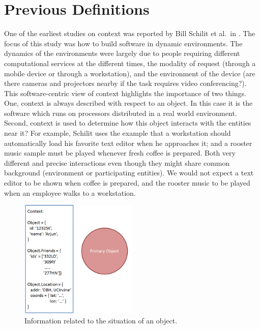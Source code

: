 \section{Previous Definitions}

One of the earliest studies on context was reported by Bill Schilit et al.\ in \cite{schilit1994context}. The focus of this study was how to build software in dynamic environments. The dynamics of the environments were largely due to people requiring different computational services at the different times, the modality of request (through a mobile device or through a workstation), and the environment of the device (are there cameras and projectors nearby if the task requires video conferencing?). This software-centric view of context highlights the importance of two things. One, context is always described with respect to an object. In this case it is the software which runs on processors distributed in a real world environment. Second, context is used to determine how this object interacts with the entities near it? For example, Schilit uses the example that a workstation should automatically load his favorite text editor when he approaches it; and a rooster music sample must be played whenever fresh coffee is prepared. Both very different and precise interactions even though they might share common background (environment or participating entities). We would not expect a text editor to be shown when coffee is prepared, and the rooster music to be played when an employee walks to a workstation.

\begin{figure}[t]
\centering
\includegraphics[width=0.5\textwidth]{media/chapter2/dey-def.png}
\caption{Information related to the situation of an object.}
\label{fig:anind-def}
\end{figure}


